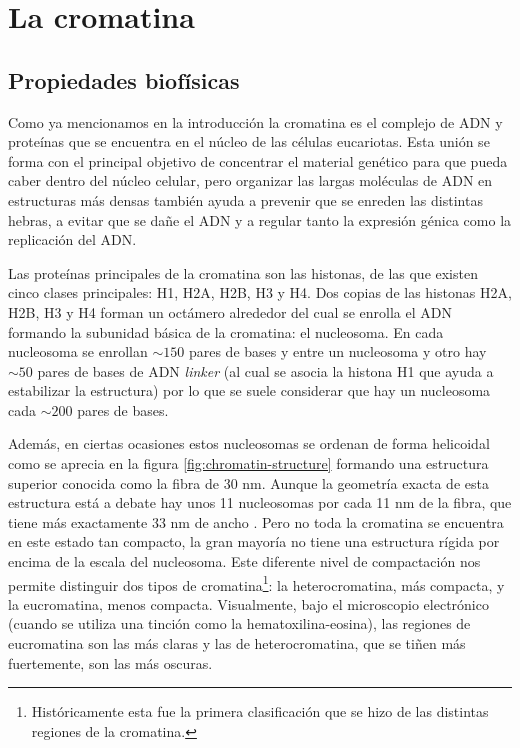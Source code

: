 \chapter{La cromatina}
\label{cap:chromatin}

\section{Propiedades biofísicas}

Como ya mencionamos en la introducción la cromatina es el complejo de ADN y proteínas que se encuentra en el núcleo de las células eucariotas. Esta unión se forma con el principal objetivo de concentrar el material genético para que pueda caber dentro del núcleo celular, pero organizar las largas moléculas de ADN en estructuras más densas también ayuda a prevenir que se enreden las distintas hebras, a evitar que se dañe el ADN y a regular tanto la expresión génica como la replicación del ADN.

Las proteínas principales de la cromatina son las histonas, de las que existen cinco clases principales: H1, H2A, H2B, H3 y H4. Dos copias de las histonas H2A, H2B, H3 y H4 forman un octámero alrededor del cual se enrolla el ADN formando la subunidad básica de la cromatina: el nucleosoma. En cada nucleosoma se enrollan $\sim150$ pares de bases y entre un nucleosoma y otro hay $\sim50$ pares de bases de ADN \textit{linker} (al cual se asocia la histona H1 que ayuda a estabilizar la estructura) por lo que se suele considerar que hay un nucleosoma cada $\sim200$ pares de bases.

Además, en ciertas ocasiones estos nucleosomas se ordenan de forma helicoidal como se aprecia en la figura \ref{fig:chromatin-structure} formando una estructura superior conocida como la fibra de 30 nm. Aunque la geometría exacta de esta estructura está a debate hay unos 11 nucleosomas por cada 11 nm de la fibra, que tiene más exactamente 33 nm de ancho \cite{Robinson2006}. Pero no toda la cromatina se encuentra en este estado tan compacto, la gran mayoría no tiene una estructura rígida por encima de la escala del nucleosoma. Este diferente nivel de compactación nos permite distinguir dos tipos de cromatina\footnote{Históricamente esta fue la primera clasificación que se hizo de las distintas regiones de la cromatina.}: la heterocromatina, más compacta, y la eucromatina, menos compacta. Visualmente, bajo el microscopio electrónico (cuando se utiliza una tinción como la hematoxilina-eosina), las regiones de eucromatina son las más claras y las de heterocromatina, que se tiñen más fuertemente, son las más oscuras.

